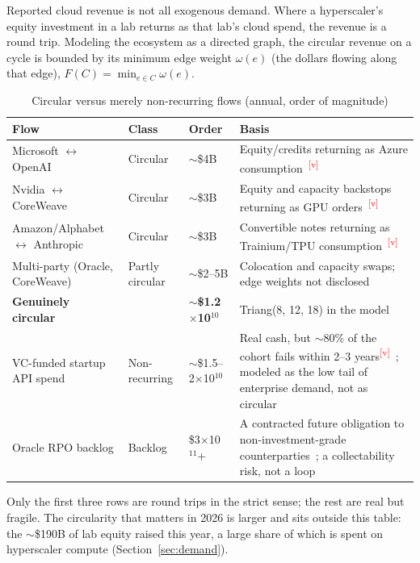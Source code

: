 \documentclass[11pt,letterpaper]{article}
\newcommand{\verify}{\textsuperscript{\textcolor{red}{[v]}}}
\begin{document}
Reported cloud revenue is not all exogenous demand. Where a hyperscaler's equity investment in a lab returns as that lab's cloud spend, the revenue is a round trip. Modeling the ecosystem as a directed graph, the circular revenue on a cycle is bounded by its minimum edge weight $\omega(e)$ (the dollars flowing along that edge), $F(C)=\min_{e\in C}\omega(e)$.
\begin{table}[htbp]
\centering
\small
\caption{Circular versus merely non-recurring flows (annual, order of magnitude)}
\label{tab:circular}
\begin{tabularx}{\textwidth}{L{4.3cm}L{1.8cm}L{2.2cm}X}
\toprule
\textbf{Flow} & \textbf{Class} & \textbf{Order} & \textbf{Basis} \\
\midrule
Microsoft $\leftrightarrow$ OpenAI & Circular & $\sim$\$4B & Equity/credits returning as Azure consumption~\cite{ref:hudson_policy}\verify \\
Nvidia $\leftrightarrow$ CoreWeave & Circular & $\sim$\$3B & Equity and capacity backstops returning as GPU orders~\cite{ref:coreweave_s1}\verify \\
Amazon/Alphabet $\leftrightarrow$ Anthropic & Circular & $\sim$\$3B & Convertible notes returning as Trainium/TPU consumption~\cite{ref:techcrunch_anthropic}\verify \\
Multi-party (Oracle, CoreWeave) & Partly circular & $\sim$\$2--5B & Colocation and capacity swaps; edge weights not disclosed \\
\midrule
\textbf{Genuinely circular} & & \textbf{$\sim$\$1.2$\times$10$^{10}$} & Triang(8, 12, 18) in the model \\
\midrule
VC-funded startup API spend & Non-recurring & $\sim$\$1.5--2$\times$10$^{10}$ & Real cash, but $\sim$80\% of the cohort fails within 2--3 years\verify~\cite{ref:cbinsights}; modeled as the low tail of enterprise demand, not as circular \\
Oracle RPO backlog & Backlog & \$3$\times$10$^{11}$+ & A contracted future obligation to non-investment-grade counterparties~\cite{ref:oracle_10q}; a collectability risk, not a loop \\
\bottomrule
\end{tabularx}
\end{table}
Only the first three rows are round trips in the strict sense; the rest are real but fragile. The circularity that matters in 2026 is larger and sits outside this table: the $\sim$\$190B of lab equity raised this year, a large share of which is spent on hyperscaler compute (Section~\ref{sec:demand}).
\end{document}
